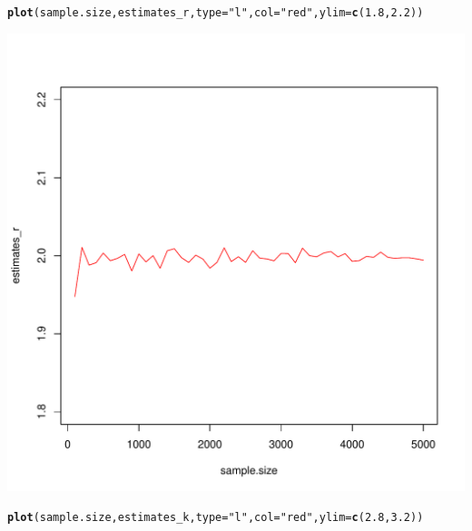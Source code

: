 \documentclass{article}\usepackage[]{graphicx}\usepackage[]{color}
\makeatletter
\def\maxwidth{ %
  \ifdim\Gin@nat@width>\linewidth
    \linewidth
  \else
    \Gin@nat@width
  \fi
}
\newcommand{\hlnum}[1]{\textcolor[rgb]{0.686,0.059,0.569}{#1}}%
\newcommand{\hlstr}[1]{\textcolor[rgb]{0.192,0.494,0.8}{#1}}%
\newcommand{\hlstd}[1]{\textcolor[rgb]{0.345,0.345,0.345}{#1}}%
\newcommand{\hlkwc}[1]{\textcolor[rgb]{0.333,0.667,0.333}{#1}}%
\newcommand{\hlkwd}[1]{\textcolor[rgb]{0.737,0.353,0.396}{\textbf{#1}}}%
\newenvironment{kframe}{%
 \def\at@end@of@kframe{}%
 \ifinner\ifhmode%
  \def\at@end@of@kframe{\end{minipage}}%
  \begin{minipage}{\columnwidth}%
 \fi\fi%
 \def\FrameCommand##1{\hskip\@totalleftmargin \hskip-\fboxsep
 \colorbox{shadecolor}{##1}\hskip-\fboxsep
     \hskip-\linewidth \hskip-\@totalleftmargin \hskip\columnwidth}%
 \MakeFramed {\advance\hsize-\width
   \@totalleftmargin\z@ \linewidth\hsize
   \@setminipage}}%
 {\par\unskip\endMakeFramed%
 \at@end@of@kframe}
\newenvironment{knitrout}{}{} %
\makeatother
\begin{document}
\begin{knitrout}
\begin{kframe}
\begin{alltt}
\hlkwd{plot}\hlstd{(sample.size, estimates_r,} \hlkwc{type} \hlstd{=} \hlstr{"l"}\hlstd{,} \hlkwc{col} \hlstd{=} \hlstr{"red"}\hlstd{,} \hlkwc{ylim}\hlstd{=}\hlkwd{c}\hlstd{(}\hlnum{1.8}\hlstd{,} \hlnum{2.2}\hlstd{))}
\end{alltt}
\end{kframe}
\includegraphics[width=\maxwidth]{figure/unnamed-chunk-17-1} 
\begin{kframe}\begin{alltt}
\hlkwd{plot}\hlstd{(sample.size, estimates_k,} \hlkwc{type} \hlstd{=} \hlstr{"l"}\hlstd{,} \hlkwc{col} \hlstd{=} \hlstr{"red"}\hlstd{,} \hlkwc{ylim}\hlstd{=}\hlkwd{c}\hlstd{(}\hlnum{2.8}\hlstd{,} \hlnum{3.2}\hlstd{))}
\end{alltt}
\end{kframe}

\end{knitrout}
\end{document}
